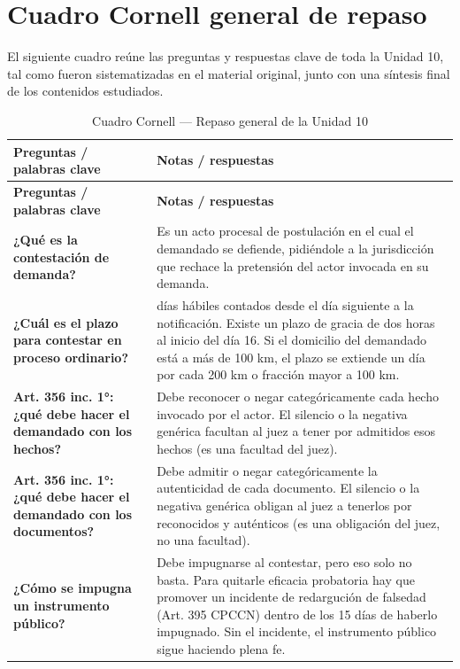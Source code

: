 \documentclass[12pt,oneside]{book}
\begin{document}
\chapter{Cuadro Cornell general de repaso}

El siguiente cuadro reúne las preguntas y respuestas clave de toda la Unidad 10, tal como fueron sistematizadas en el material original, junto con una síntesis final de los contenidos estudiados.

\begin{longtable}{
    >{\raggedright\arraybackslash}p{}
    >{\raggedright\arraybackslash}p{}
}
\caption{Cuadro Cornell — Repaso general de la Unidad 10} \\
\toprule
\textbf{Preguntas / palabras clave} & \textbf{Notas / respuestas} \\
\midrule
\endfirsthead
\toprule
\textbf{Preguntas / palabras clave} & \textbf{Notas / respuestas} \\
\midrule
\endhead

\textbf{¿Qué es la contestación de demanda?} &
Es un acto procesal de postulación en el cual el demandado se defiende, pidiéndole a la jurisdicción que rechace la pretensión del actor invocada en su demanda. \\

\textbf{¿Cuál es el plazo para contestar en proceso ordinario?} &
15 días hábiles contados desde el día siguiente a la notificación. Existe un plazo de gracia de dos horas al inicio del día 16. Si el domicilio del demandado está a más de 100 km, el plazo se extiende un día por cada 200 km o fracción mayor a 100 km. \\

\textbf{Art. 356 inc. 1°: ¿qué debe hacer el demandado con los hechos?} &
Debe reconocer o negar categóricamente cada hecho invocado por el actor. El silencio o la negativa genérica facultan al juez a tener por admitidos esos hechos (es una facultad del juez). \\

\textbf{Art. 356 inc. 1°: ¿qué debe hacer el demandado con los documentos?} &
Debe admitir o negar categóricamente la autenticidad de cada documento. El silencio o la negativa genérica obligan al juez a tenerlos por reconocidos y auténticos (es una obligación del juez, no una facultad). \\

\textbf{¿Cómo se impugna un instrumento público?} &
Debe impugnarse al contestar, pero eso solo no basta. Para quitarle eficacia probatoria hay que promover un incidente de redargución de falsedad (Art. 395 CPCCN) dentro de los 15 días de haberlo impugnado. Sin el incidente, el instrumento público sigue haciendo plena fe. \\


\end{longtable}
\end{document}
